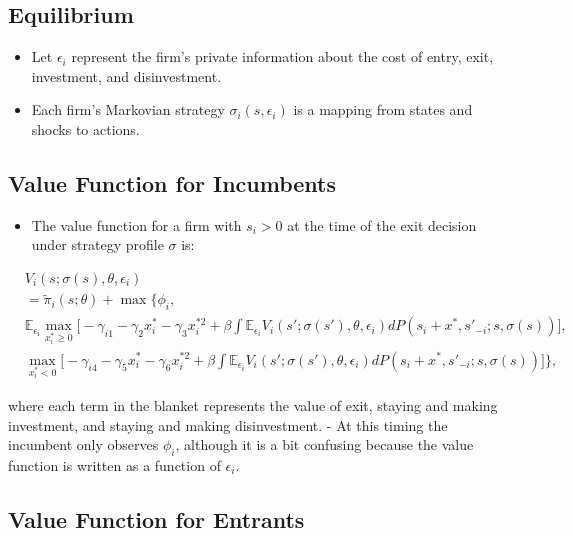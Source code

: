 \documentclass[]{book}
\providecommand{\tightlist}{%
  \setlength{\itemsep}{0pt}\setlength{\parskip}{0pt}}
\begin{document}
\subsection{Equilibrium}\label{equilibrium}

\begin{itemize}
\tightlist
\item
  Let \(\epsilon_i\) represent the firm's private information about the
  cost of entry, exit, investment, and disinvestment.
\item
  Each firm's Markovian strategy \(\sigma_i(s, \epsilon_i)\) is a
  mapping from states and shocks to actions.
\end{itemize}

\subsection{Value Function for
Incumbents}\label{value-function-for-incumbents}

\begin{itemize}
\tightlist
\item
  The value function for a firm with \(s_i > 0\) at the time of the exit
  decision under strategy profile \(\sigma\) is:
\end{itemize}

\begin{equation}
\begin{split}
&V_i(s; \sigma(s), \theta, \epsilon_i)\\
&=\tilde{\pi}_i(s; \theta) + \max\Bigg\{\phi_i,\\
& \mathbb{E}_{\epsilon_i}\max_{x_i^* \ge 0}  \Bigg[ - \gamma_{i1} - \gamma_{2} x_i^* - \gamma_3 x_i^{*2} + \beta \int \mathbb{E}_{\epsilon_i} V_i(s'; \sigma(s'), \theta, \epsilon_i) dP(s_i + x^*, s'_{-i}; s, \sigma(s))\Bigg],\\
&\max_{x_i^* < 0} \Bigg[- \gamma_{i4} - \gamma_5 x_i^* - \gamma_6 x_i^{*2} + \beta \int \mathbb{E}_{\epsilon_i} V_i(s'; \sigma(s'), \theta, \epsilon_i) dP(s_i + x^*, s'_{-i}; s, \sigma(s))  \Bigg]\Bigg\},
\end{split}
\end{equation}

where each term in the blanket represents the value of exit, staying and
making investment, and staying and making disinvestment. - At this
timing the incumbent only observes \(\phi_i\), although it is a bit
confusing because the value function is written as a function of
\(\epsilon_i\).

\subsection{Value Function for
Entrants}\label{value-function-for-entrants}
\end{document}
